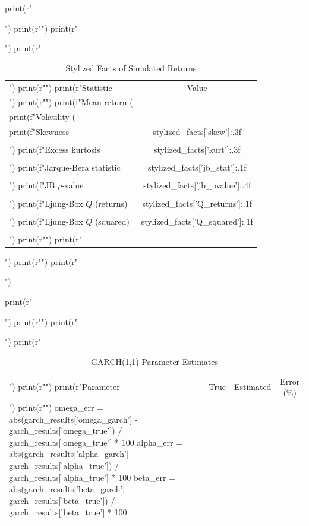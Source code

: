 \documentclass[a4paper, 11pt]{article}
\begin{document}
\begin{pycode}
print(r"\begin{table}[htbp]")
print(r"\centering")
print(r"\caption{Stylized Facts of Simulated Returns}")
print(r"\begin{tabular}{lc}")
print(r"\toprule")
print(r"Statistic & Value \\")
print(r"\midrule")
print(f"Mean return (\\%
print(f"Volatility (\\%
print(f"Skewness & {stylized_facts['skew']:.3f} \\\\")
print(f"Excess kurtosis & {stylized_facts['kurt']:.3f} \\\\")
print(f"Jarque-Bera statistic & {stylized_facts['jb_stat']:.1f} \\\\")
print(f"JB $p$-value & {stylized_facts['jb_pvalue']:.4f} \\\\")
print(f"Ljung-Box $Q$ (returns) & {stylized_facts['Q_returns']:.1f} \\\\")
print(f"Ljung-Box $Q$ (squared) & {stylized_facts['Q_squared']:.1f} \\\\")
print(r"\bottomrule")
print(r"\end{tabular}")
print(r"\label{tab:stylized}")
print(r"\end{table}")

print(r"\begin{table}[htbp]")
print(r"\centering")
print(r"\caption{GARCH(1,1) Parameter Estimates}")
print(r"\begin{tabular}{lccc}")
print(r"\toprule")
print(r"Parameter & True & Estimated & Error (\%) \\")
print(r"\midrule")
omega_err = abs(garch_results['omega_garch'] - garch_results['omega_true']) / garch_results['omega_true'] * 100
alpha_err = abs(garch_results['alpha_garch'] - garch_results['alpha_true']) / garch_results['alpha_true'] * 100
beta_err = abs(garch_results['beta_garch'] - garch_results['beta_true']) / garch_results['beta_true'] * 100


\end{tabular}
\end{table}
\end{pycode}
\end{document}
